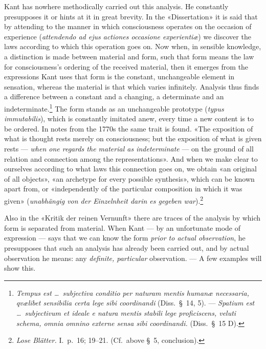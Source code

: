 \documentclass[12pt,a4paper]{article}
\newcommand{\opage}[1]{\marginnote{\footnotesize\textit{[#1]}}}
\begin{document}
Kant has nowhere methodically carried out this analysis. He constantly
presupposes it or hints at it in great brevity. In the «Dissertation» it
is said that by attending to the manner in which consciousness operates on
the occasion of experience (\textit{attendendo ad ejus actiones occasione
experientiæ}) we discover the laws according to which this operation goes
on. Now when, in sensible knowledge, a distinction is made between material
and form, such that form means the law for consciousness's ordering of the
received material, then it emerges from the expressions Kant uses that form
is the constant, unchangeable element in sensation, whereas the material is
that which varies infinitely. Analysis thus finds a difference between a
constant and a changing, a determinate and an
indeterminate.\footnote{\textit{Tempus est \ldots\ subjectiva conditio per
naturam mentis humanæ necessaria, \emph{qvælibet} sensibilia certa lege
sibi coordinandi} (Diss.\ §\ 14, 5). --- \textit{Spatium est \ldots\
subjectivum et ideale e natura mentis \emph{stabili lege} proficiscens, veluti
schema, \emph{omnia omnino externe sensa} sibi coordinandi.} (Diss.\ §\ 15 D).}
The form stands as an unchangeable prototype (\textit{typus immutabilis}),
which is constantly imitated anew, every time a new content is to be
ordered. In notes from the 1770s the same trait is found. «The exposition
of what is thought rests merely on consciousness; but the exposition of
what is given rests --- \emph{when one regards the material as indeterminate} ---
on the ground of all relation and connection among the representations».
And when we make clear to ourselves according to what laws this connection
goes on, we obtain «an original of all objects», «an \opage{27}archetype for every
possible synthesis», which can be known apart from, or «independently of
the particular composition in which it was given» (\emph{unabhängig von
der Einzelnheit darin es gegeben war}).\footnote{\textit{Lose Blätter.} I.\
p.\ 16; 19--21. (Cf.\ above §\ 5, conclusion).}

Also in the «Kritik der reinen Vernunft» there are traces of the analysis
by which form is separated from material. When Kant --- by an unfortunate
mode of expression --- says that we can know the form \emph{prior to actual
observation}, he presupposes that such an analysis has already been carried
out, and by actual observation he means: any \emph{definite, particular}
observation. --- A few examples will show this.
\end{document}

